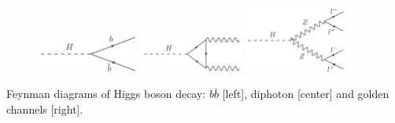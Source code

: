 \begin{frame}{}
\vspace{-.2cm}
\begin{figure}[!Hhtbp]
  \begin{center}
    \includegraphics[width=0.3\textwidth]{../figs/BB_H.png}
    \includegraphics[width=0.3\textwidth]{../figs/Diphoton_H.png}
    \includegraphics[width=0.3\textwidth]{../figs/Golden_H.png}
  \end{center}
\end{figure}

\vspace{-.2cm}
    \begin{block}{}
      \tiny \centering Feynman diagrams of Higgs boson decay: $b\bar{b}$ [left], diphoton [center] and golden channels [right].
    \end{block}

\end{frame}

